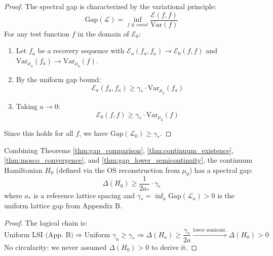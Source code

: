 \begin{proof}
The spectral gap is characterized by the variational principle:
\begin{equation}
    \text{Gap}(\mathcal{L}) = \inf_{f \not\equiv const} \frac{\mathcal{E}(f, f)}{\text{Var}(f)}
\end{equation}
For any test function $f$ in the domain of $\mathcal{E}_0$:
\begin{enumerate}
    \item Let $f_a$ be a recovery sequence with $\mathcal{E}_a(f_a, f_a) \to \mathcal{E}_0(f, f)$ and $\text{Var}_{\mu_a}(f_a) \to \text{Var}_{\mu_0}(f)$.
    \item By the uniform gap bound:
    \begin{equation}
        \mathcal{E}_a(f_a, f_a) \geq \gamma_* \cdot \text{Var}_{\mu_a}(f_a)
    \end{equation}
    \item Taking $a \to 0$:
    \begin{equation}
        \mathcal{E}_0(f, f) \geq \gamma_* \cdot \text{Var}_{\mu_0}(f)
    \end{equation}
\end{enumerate}
Since this holds for all $f$, we have $\text{Gap}(\mathcal{L}_0) \geq \gamma_*$.
\end{proof}

\begin{corollary}\label{cor:continuum_hamiltonian_gap}
Combining Theorems \ref{thm:gap_comparison}, \ref{thm:continuum_existence}, \ref{thm:mosco_convergence}, and \ref{thm:gap_lower_semicontinuity}, the continuum Hamiltonian $H_0$ (defined via the OS reconstruction from $\mu_0$) has a spectral gap:
\begin{equation}
    \Delta(H_0) \geq \frac{1}{2a_*} \cdot \gamma_*
\end{equation}
where $a_*$ is a reference lattice spacing and $\gamma_* = \inf_a \text{Gap}(\mathcal{L}_a) > 0$ is the uniform lattice gap from Appendix B.
\end{corollary}

\begin{proof}
The logical chain is:
\begin{equation}
    \boxed{\text{Uniform LSI (App. B)}} \Rightarrow \boxed{\text{Uniform } \gamma_a \geq \gamma_*} \Rightarrow \boxed{\Delta(H_a) \geq \frac{\gamma_*}{2a}} \xrightarrow{\text{lower semicont.}} \boxed{\Delta(H_0) > 0}
\end{equation}
No circularity: we never assumed $\Delta(H_0) > 0$ to derive it.
\end{proof}

